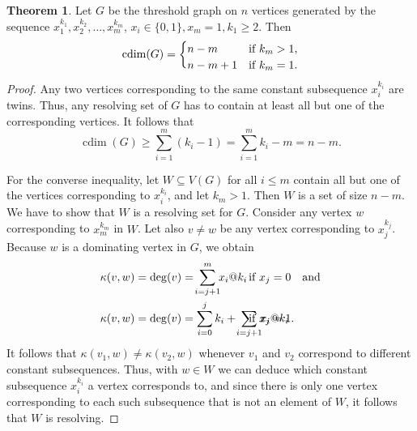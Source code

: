 \documentclass[letterpaper,12pt,headings=normal,parskip=half]{scrartcl}
\DeclareMathOperator{\cdim}{cdim}
\theoremstyle{definition}
\newtheorem{theorem}{Theorem}
\begin{document}
\begin{theorem}\label{thm:cdimthreshold}
    Let $G$ be the threshold graph on $n$ vertices generated by the sequence $x_1^{k_1},x_2^{k_2},\ldots, x_m^{k_m}$, $x_i\in\{0,1\},x_m=1,k_1\geq 2$. Then
    \begin{equation*}
        \cdim(G)=\begin{cases}
            n-m   &\text{if }k_m > 1, \\
            n-m+1 &\text{if }k_m = 1.\vspace{-1ex}
        \end{cases}
    \end{equation*}
\end{theorem}
\begin{proof}
    Any two vertices corresponding to the same constant subsequence $x_i^{k_i}$ are twins. 
    Thus, any resolving set of $G$ has to contain at least all but one of the corresponding vertices.
    It follows that
    \begin{equation*}
        \cdim(G)\geq\sum_{i=1}^m(k_i-1)=\sum_{i=1}^mk_i-m=n-m.
    \end{equation*}

    For the converse inequality, let $W\subseteq V(G)$ for all $i\leq m$ contain all but one of the vertices corresponding to $x_i^{k_i}$, and let $k_m>1$. 
    Then $W$ is a set of size $n-m$. 
    We have to show that $W$ is a resolving set for $G$. 
    Consider any vertex $w$ corresponding to $x_m^{k_m}$ in $W$. 
    Let also $v\neq w$ be any vertex corresponding to $x_j^{k_j}$. 
    Because $w$ is a dominating vertex in $G$, we obtain\vspace{-1ex}
    \begin{align*}
        \kappa(v,w)&=\deg(v)=\!\sum_{i=j+1}^m\!\!x_i@k_i&&\hspace{-16mm}\text{if }x_j=0\quad\text{and}\\
        \kappa(v,w)&=\deg(v)=\sum_{i=0}^jk_i+\!\sum_{i=j+1}\!\!x_i@k_i&&\hspace{-16mm}\text{if }x_j=1.
    \end{align*}
    It follows that $\kappa(v_1,w)\neq\kappa(v_2,w)$ whenever $v_1$ and $v_2$ correspond to different constant subsequences.
    Thus, with $w\in W$ we can deduce which constant subsequence $x_i^{k_i}$ a vertex corresponds to, and since there is only one vertex corresponding to each such subsequence that is not an element of $W$, it follows that $W$ is resolving.
    

\end{proof}
\end{document}
